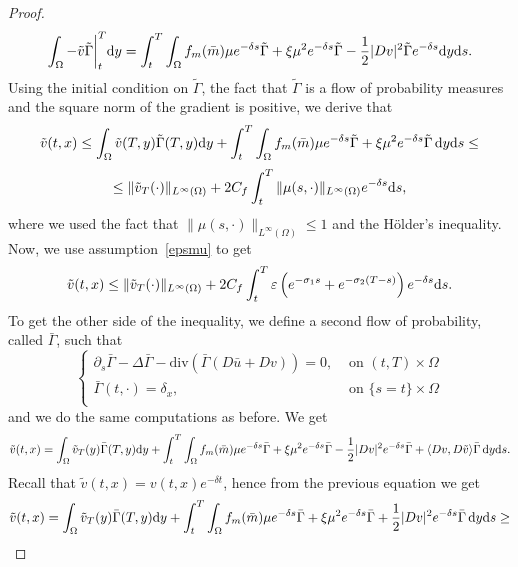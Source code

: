 \documentclass[10pt,a4paper,nouppercase,nowrite]{article}
\numberwithin{equation}{section}
\newcommand{\di}{{\rm d}}
\newcommand{\eps}{\varepsilon}
\theoremstyle{definition}
\begin{document}
\begin{proof}
\begin{equation*}
			\int_{\Omega} - \tilde v \tilde{\Gamma} \bigg |_{t}^{T} \di y = \int_t^T \int_{\Omega} f_m(\bar{m})\mu e^{-\delta s} \tilde{\Gamma} + \xi \mu^2 e^{-\delta s} \tilde{\Gamma} - \frac{1}{2} |Dv|^2 \tilde{\Gamma} e^{-\delta s} \di y \di s.
		\end{equation*}
		Using the initial condition on $\tilde{\Gamma}$, the fact that $\tilde{\Gamma}$ is a flow of probability measures and the square norm of the gradient is positive, we derive that
		$$\tilde{v}(t,x) \le \int_{\Omega} \tilde v(T,y) \tilde{\Gamma}(T,y) \di y + \int_t^T \int_{\Omega} f_m(\bar{m})\mu e^{-\delta s} \tilde{\Gamma} + \xi \mu^2 e^{-\delta s} \tilde{\Gamma} \, \di y \di s \le$$
		$$\le \|\tilde{v}_T(\cdot)\|_{L^{\infty}(\Omega)} + 2C_f \int_t^T \|\mu(s,\cdot)\|_{L^{\infty}(\Omega)} e^{-\delta s} \di s,$$
		where we used the fact that $ \| \mu(s,\cdot) \|_{L^{\infty}(\Omega)} \le 1$ and the Hölder's inequality. Now, we use assumption~\eqref{epsmu} to get
		\begin{equation}
			\tilde{v}(t,x) \le \|\tilde{v}_T(\cdot)\|_{L^{\infty}(\Omega)} +2 C_f \int_t^T \eps \left( e^{-\sigma_1 s} + e^{-\sigma_2(T-s)} \right) e^{-\delta s} \di s.
			\label{side1}
		\end{equation}
		To get the other side of the inequality, we define a second flow of probability, called $\bar{\Gamma}$, such that
		\begin{equation*}
			\begin{cases}
				\partial_s \bar{\Gamma} - \Delta \bar{\Gamma} - \text{div}(\bar{\Gamma}(D\bar{u} + Dv)) = 0,& \text{ on } (t,T) \times \Omega \\
				\bar{\Gamma}(t,\cdot) = \delta_x,& \text{ on } \{ s=t \} \times \Omega \\
			\end{cases}
		\end{equation*}
		and we do the same computations as before. We get
		\begin{equation*}
			\tilde{v}(t,x)= \int_{\Omega} \tilde{v}_T(y) \bar{\Gamma}(T,y) \di y + \int_t^T \int_{\Omega} f_m(\bar m) \mu e^{-\delta s}  \bar{\Gamma} + \xi \mu^2 e^{-\delta s}  \bar{\Gamma} - \frac{1}{2} |Dv|^2  e^{-\delta s}  \bar{\Gamma} + \langle Dv,D\tilde{v} \rangle \bar{\Gamma} \, \di y \di s.
		\end{equation*}
		Recall that $\tilde{v}(t,x)=v(t,x) e^{-\delta t}$, hence from the previous equation we get
		\begin{equation*}
			\tilde{v}(t,x)= \int_{\Omega} \tilde{v}_T(y) \bar{\Gamma}(T,y) \di y + \int_t^T \int_{\Omega} f_m(\bar m) \mu e^{-\delta s}  \bar{\Gamma} + \xi \mu^2 e^{-\delta s}  \bar{\Gamma} + \frac{1}{2} |Dv|^2 e^{-\delta s} \bar{\Gamma} \, \di y \di s \geq

\end{equation*}
\end{proof}
\end{document}
